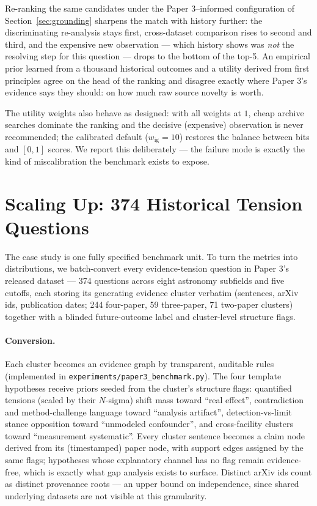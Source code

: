 \documentclass[11pt]{article}
\begin{document}
Re-ranking the same candidates under the Paper 3--informed configuration
of Section~\ref{sec:grounding} sharpens the match with history further:
the discriminating re-analysis stays first, cross-dataset comparison
rises to second and third, and the expensive new observation --- which
history shows was \emph{not} the resolving step for this question ---
drops to the bottom of the top-5. An empirical prior learned from a
thousand historical outcomes and a utility derived from first principles
agree on the head of the ranking and disagree exactly where Paper 3's
evidence says they should: on how much raw source novelty is worth.

The utility weights also behave as designed: with all weights at $1$,
cheap archive searches dominate the ranking and the decisive (expensive)
observation is never recommended; the calibrated default
($w_{\mathrm{ig}}=10$) restores the balance between bits and $[0,1]$
scores. We report this deliberately --- the failure mode is exactly the
kind of miscalibration the benchmark exists to expose.

\section{Scaling Up: 374 Historical Tension Questions}
\label{sec:scale}

The case study is one fully specified benchmark unit. To turn the
metrics into distributions, we batch-convert every evidence-tension
question in Paper 3's released dataset --- 374 questions across eight
astronomy subfields and five cutoffs, each storing its generating
evidence cluster verbatim (sentences, arXiv ids, publication dates;
244 four-paper, 59 three-paper, 71 two-paper clusters) together with a
blinded future-outcome label and cluster-level structure flags.

\paragraph{Conversion.} Each cluster becomes an evidence graph by
transparent, auditable rules (implemented in
\texttt{experiments/paper3\_benchmark.py}). The four template
hypotheses receive priors seeded from the cluster's structure flags:
quantified tensions (scaled by their $N$-sigma) shift mass toward
``real effect'', contradiction and method-challenge language toward
``analysis artifact'', detection-vs-limit stance opposition toward
``unmodeled confounder'', and cross-facility clusters toward
``measurement systematic''. Every cluster sentence becomes a claim node
derived from its (timestamped) paper node, with support edges assigned
by the same flags; hypotheses whose explanatory channel has no flag
remain evidence-free, which is exactly what gap analysis exists to
surface. Distinct arXiv ids count as distinct provenance roots --- an
upper bound on independence, since shared underlying datasets are not
visible at this granularity.
\end{document}
